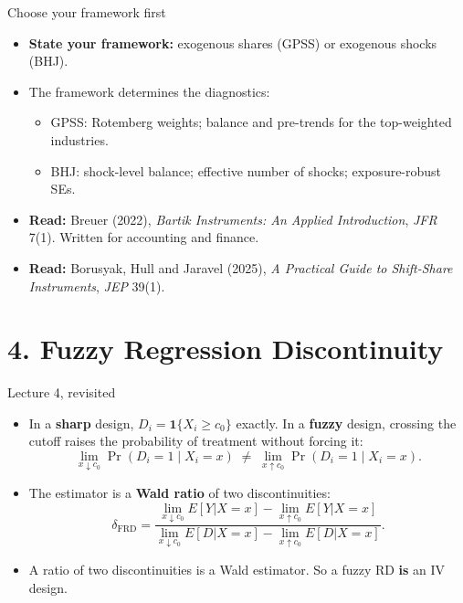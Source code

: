 \documentclass[
  11pt,
  ignorenonframetext,
  aspectratio=169,
]{beamer}
\providecommand{\tightlist}{%
  \setlength{\itemsep}{0pt}\setlength{\parskip}{0pt}}
\begin{document}
\begin{frame}{Choose your framework first}
\protect{}\label{choose-your-framework-first}
\begin{itemize}
\tightlist
\item
  \textbf{State your framework:} exogenous shares (GPSS) or exogenous
  shocks (BHJ).
\item
  The framework determines the diagnostics:

  \begin{itemize}
  \tightlist
  \item
    GPSS: Rotemberg weights; balance and pre-trends for the top-weighted
    industries.
  \item
    BHJ: shock-level balance; effective number of shocks;
    exposure-robust SEs.
  \end{itemize}
\end{itemize}

\vspace{0.3em}

\begin{itemize}
\tightlist
\item
  \textbf{Read:} Breuer (2022), \emph{Bartik Instruments: An Applied
  Introduction}, \emph{JFR} 7(1). Written for accounting and finance.
\item
  \textbf{Read:} Borusyak, Hull and Jaravel (2025), \emph{A Practical
  Guide to Shift-Share Instruments}, \emph{JEP} 39(1).
\end{itemize}
\end{frame}

\section{4. Fuzzy Regression
Discontinuity}\label{fuzzy-regression-discontinuity}

\begin{frame}{Lecture 4, revisited}
\protect{}\label{lecture-4-revisited}
\begin{itemize}
\tightlist
\item
  In a \textbf{sharp} design, \(D_i = \mathbf{1}\{X_i \geq c_0\}\)
  exactly. In a \textbf{fuzzy} design, crossing the cutoff raises the
  probability of treatment without forcing it: \[
  \lim_{x \downarrow c_0} \Pr(D_i = 1 \mid X_i = x) \;\neq\; \lim_{x \uparrow c_0} \Pr(D_i = 1 \mid X_i = x).
  \]
\item
  The estimator is a \textbf{Wald ratio} of two discontinuities: \[
  \delta_{\text{FRD}} = \frac{\lim_{x\downarrow c_0} E[Y|X=x] - \lim_{x\uparrow c_0} E[Y|X=x]}
                           {\lim_{x\downarrow c_0} E[D|X=x] - \lim_{x\uparrow c_0} E[D|X=x]} .
  \]
\item
  A ratio of two discontinuities is a Wald estimator. So a fuzzy RD
  \textbf{is} an IV design.
\end{itemize}
\end{frame}
\end{document}

